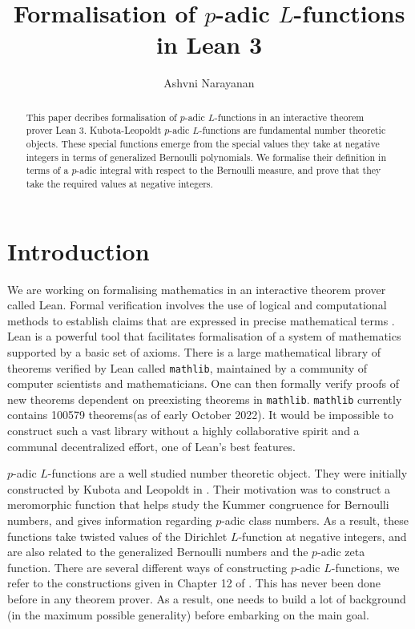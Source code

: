 \documentclass[a4paper,UKenglish,cleveref, autoref, thm-restate]{lipics-v2021}
\title{Formalisation of $p$-adic $L$-functions in Lean 3} %
\author{Ashvni Narayanan}{London School of Geometry and Number Theory, Imperial College London}{a.narayanan20@imperial.ac.uk}{https://orcid.org/0000-0003-2777-4228}{EPSRC Grant EP/S021590/1 (UK)}%
\newcommand{\lean}[1]{\texttt{#1}\xspace} %
\begin{document}
\maketitle

\begin{abstract}
This paper decribes formalisation of $p$-adic $L$-functions in an interactive theorem prover Lean 3. Kubota-Leopoldt $p$-adic 
$L$-functions are fundamental number theoretic objects. These special functions emerge from the special 
values they take at negative integers in terms of generalized Bernoulli polynomials. We formalise their 
definition in terms of a $p$-adic integral with respect to the Bernoulli measure, and prove that they 
take the required values at negative integers.
\end{abstract}

\section{Introduction}
We are working on formalising mathematics in an interactive theorem prover called Lean. 
Formal verification involves the use of logical and computational methods to establish 
claims that are expressed in precise mathematical terms \cite{TPIL}. Lean is a powerful tool 
that facilitates formalisation of a system of mathematics supported by a basic set of axioms. There is a large mathematical library of theorems verified by Lean called \lean{mathlib}, maintained by a community of computer scientists and mathematicians. One can then 
formally verify proofs of new theorems dependent on preexisting theorems in \lean{mathlib}. 
\lean{mathlib} currently contains 100579 theorems(as of early October 2022). It would be impossible to construct 
such a vast library without a highly collaborative spirit and a communal decentralized effort, one of 
Lean's best features. 

$p$-adic $L$-functions are a well studied number theoretic object. They were initially constructed 
by Kubota and Leopoldt in \cite{KL}. Their motivation was to construct a meromorphic function that helps study 
the Kummer congruence for Bernoulli numbers, and gives information regarding $p$-adic class numbers. 
As a result, these functions take twisted values of the Dirichlet $L$-function at negative integers, and 
are also related to the generalized Bernoulli numbers and the $p$-adic zeta function. There are several different ways of 
constructing $p$-adic $L$-functions, we refer to the constructions
given in Chapter 12 of \cite{cyc}. This has never been done before in any 
theorem prover. As a result, one needs to build a lot of background (in the maximum possible generality) 
before embarking on the main goal.
\end{document}
